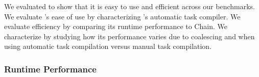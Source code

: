 We evaluated \sys to show that it is easy to use and efficient across our
benchmarks.  We evaluate \sys's ease of use by characterizing \sys's automatic
task compiler.  We evaluate \sys efficiency by comparing its runtime
performance to Chain.  We characterize \sys by studying how its performance
varies due to coalescing and when using automatic task compilation versus
manual task compilation.

%


\subsubsection{\sys Runtime Performance}
\label{sec:result_coalescing}

